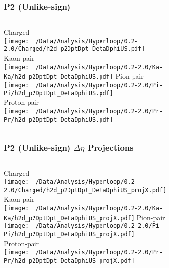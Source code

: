 \documentclass{beamer}
\begin{document}
\begin{frame}
	\frametitle{P2 (Unlike-sign)}
	\begin{columns}
		\centering
		Charged\\
		\texttt{[image: ~/Data/Analysis/Hyperloop/0.2-2.0/Charged/h2d\_p2DptDpt\_DetaDphiUS.pdf]}\\Kaon-pair\\
		\texttt{[image: ~/Data/Analysis/Hyperloop/0.2-2.0/Ka-Ka/h2d\_p2DptDpt\_DetaDphiUS.pdf]}
		\centering
		Pion-pair\\
		\texttt{[image: ~/Data/Analysis/Hyperloop/0.2-2.0/Pi-Pi/h2d\_p2DptDpt\_DetaDphiUS.pdf]}\\Proton-pair\\
		\texttt{[image: ~/Data/Analysis/Hyperloop/0.2-2.0/Pr-Pr/h2d\_p2DptDpt\_DetaDphiUS.pdf]}
	\end{columns}
\end{frame}
\begin{frame}
	\frametitle{P2 (Unlike-sign) $\Delta\eta$ Projections}
	\begin{columns}
		\column{0.5\textwidth}
		\centering
		Charged\\
		\texttt{[image: ~/Data/Analysis/Hyperloop/0.2-2.0/Charged/h2d\_p2DptDpt\_DetaDphiUS\_projX.pdf]}\\Kaon-pair\\
		\texttt{[image: ~/Data/Analysis/Hyperloop/0.2-2.0/Ka-Ka/h2d\_p2DptDpt\_DetaDphiUS\_projX.pdf]}
		\column{0.5\textwidth}
		\centering
		Pion-pair\\
		\texttt{[image: ~/Data/Analysis/Hyperloop/0.2-2.0/Pi-Pi/h2d\_p2DptDpt\_DetaDphiUS\_projX.pdf]}\\Proton-pair\\
		\texttt{[image: ~/Data/Analysis/Hyperloop/0.2-2.0/Pr-Pr/h2d\_p2DptDpt\_DetaDphiUS\_projX.pdf]}
	\end{columns}
\end{frame}
\end{document}
